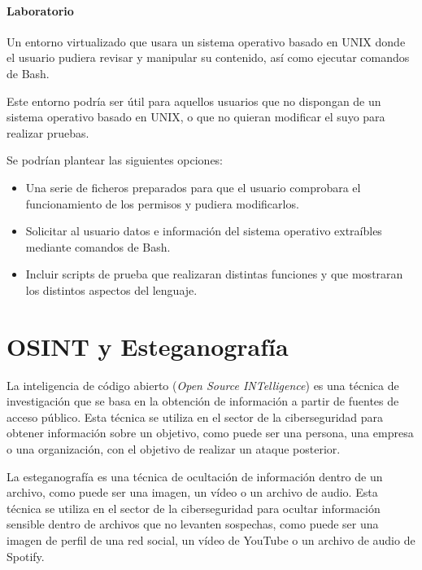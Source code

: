         \paragraph{Laboratorio}

            Un entorno virtualizado que usara un sistema operativo basado en UNIX donde el usuario pudiera revisar y manipular su contenido, así como ejecutar comandos de Bash.

            Este entorno podría ser útil para aquellos usuarios que no dispongan de un sistema operativo basado en UNIX, o que no quieran modificar el suyo para realizar pruebas.

            Se podrían plantear las siguientes opciones:
            
            \begin{itemize}
                \item Una serie de ficheros preparados para que el usuario comprobara el funcionamiento de los permisos y pudiera modificarlos.
                \item Solicitar al usuario datos e información del sistema operativo extraíbles mediante comandos de Bash.
                \item Incluir scripts de prueba que realizaran distintas funciones y que mostraran los distintos aspectos del lenguaje.
            \end{itemize}


    \section{OSINT y Esteganografía}

        La inteligencia de código abierto (\textit{Open Source INTelligence}) es una técnica de investigación que se basa en la obtención de información a partir de fuentes de acceso público. Esta técnica se utiliza en el sector de la ciberseguridad para obtener información sobre un objetivo, como puede ser una persona, una empresa o una organización, con el objetivo de realizar un ataque posterior.

        La esteganografía es una técnica de ocultación de información dentro de un archivo, como puede ser una imagen, un vídeo o un archivo de audio. Esta técnica se utiliza en el sector de la ciberseguridad para ocultar información sensible dentro de archivos que no levanten sospechas, como puede ser una imagen de perfil de una red social, un vídeo de YouTube o un archivo de audio de Spotify.

